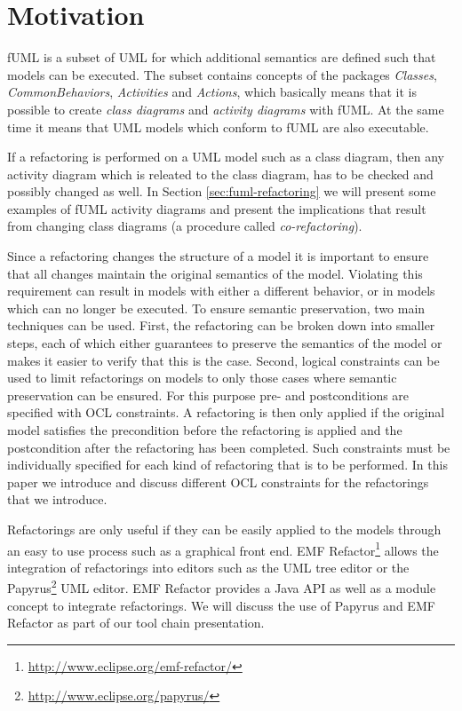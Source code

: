 \documentclass{llncs}
\begin{document}
\section{Motivation}
\label{sec:motivation}
fUML is a subset of UML for which additional semantics are defined such that models can be executed. The subset contains concepts
of the packages \textit{Classes}, 
\textit{CommonBehaviors}, \textit{Activities} and \textit{Actions}, which basically means that it is possible to create 
\textit{class diagrams} and \textit{activity diagrams} with fUML. At the same time it means that UML models which conform to fUML
are also executable.

If a refactoring 
is performed on a UML model such as a class diagram, then any activity diagram which is releated to the class diagram, has 
to be checked and possibly changed as well. In Section \ref{sec:fuml-refactoring} we will present some examples of fUML 
activity diagrams and present the implications that result from changing class 
diagrams (a procedure called \textit{co-refactoring}).

Since a refactoring changes the structure of a model it is important to ensure that all changes maintain the original 
semantics of the model. Violating this requirement can result in models with either a different behavior, or in models 
which can no longer be executed. To ensure semantic preservation, two main techniques can be used. First, the refactoring 
can be broken down into smaller steps, each of which either guarantees to preserve the semantics of the model or makes it 
easier to verify that this is the case. Second, logical constraints can be used to limit refactorings on models to only 
those cases where semantic preservation can be ensured. For this purpose pre- and postconditions are specified with OCL 
constraints. A refactoring is then only applied if the original model satisfies the precondition before the refactoring is 
applied and the postcondition after the refactoring has been completed. Such constraints must be individually specified 
for each kind of refactoring that is to be performed. In this paper we introduce and discuss different OCL constraints 
for the refactorings that we introduce.

Refactorings are only useful if they can be easily applied to the models through an easy to use process such as a 
graphical front end. EMF Refactor\footnote{\url{http://www.eclipse.org/emf-refactor/}} allows the integration of 
refactorings into editors such as the UML tree editor or 
the Papyrus\footnote{\url{http://www.eclipse.org/papyrus/}} UML editor. EMF Refactor provides a Java API as well as a module 
concept to integrate refactorings. We will discuss the use 
of Papyrus and EMF Refactor as part of our tool chain presentation.
\end{document}
